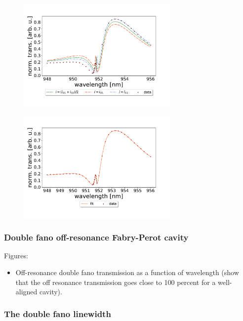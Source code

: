 \begin{figure}[h!]
    \centering
    \includegraphics[width=0.7\textwidth]{figures/results/34um_long_scan_sim_comparison.pdf}
    \caption{}
    \label{fig:34um_long_scan_sim_comparison}
\end{figure}

\begin{figure}[h!]
    \centering
    \includegraphics[width=0.7\textwidth]{figures/results/34um_long_scan_fit.pdf}
    \caption{}
    \label{fig:34um_long_scan_fit}
\end{figure}


\subsubsection{Double fano off-resonance Fabry-Perot cavity}

Figures:
\begin{itemize}
    \item Off-resonance double fano transmission as a function of wavelength (show that the off resonance transmission goes close to 100 percent for a well-aligned cavity).
\end{itemize}

\subsubsection{The double fano linewidth}


